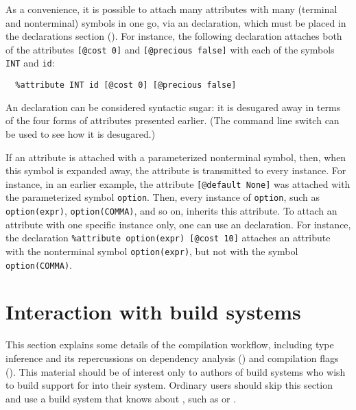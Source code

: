 \documentclass[onecolumn,11pt,nocopyrightspace,preprint]{sigplanconf}
\begin{document}

As a convenience, it is possible to attach many attributes with many (terminal
and nonterminal) symbols in one go, via an \dattribute declaration, which must
be placed in the declarations section ().
For instance, the following declaration attaches both of the attributes
\verb+[@cost 0]+ and \verb+[@precious false]+
with each of the symbols
\verb+INT+ and \verb+id+:
\begin{verbatim}
  %attribute INT id [@cost 0] [@precious false]
\end{verbatim}
An \dattribute declaration can be considered syntactic sugar: it is desugared
away in terms of the four forms of attributes presented earlier. (The command
line switch \oonlypreprocess can be used to see how it is desugared.)


If an attribute is attached with a parameterized nonterminal symbol, then,
when this symbol is expanded away, the attribute is transmitted to every
instance. For instance, in an earlier example, the attribute
\verb+[@default None]+ was attached with the parameterized symbol
\verb+option+. Then, every instance of \verb+option+, such as
\verb+option(expr)+, \verb+option(COMMA)+, and so on, inherits this
attribute. To attach an attribute with one specific
instance only, one can use an \dattribute declaration. For instance,
the declaration \verb+%attribute option(expr) [@cost 10]+ attaches
an attribute with the nonterminal symbol \verb+option(expr)+, but
not with the symbol \verb+option(COMMA)+.


\section{Interaction with build systems}
\label{sec:build}

This section explains some details of the compilation workflow, including
\ocaml type inference and its repercussions on dependency analysis
() and compilation flags ().
%
This material should be of interest only to authors of build systems
who wish to build support for \menhir into their system.
%
Ordinary users should skip this section and use a build system that knows
about \menhir, such as \ocamlbuild or \dune.
\end{document}
